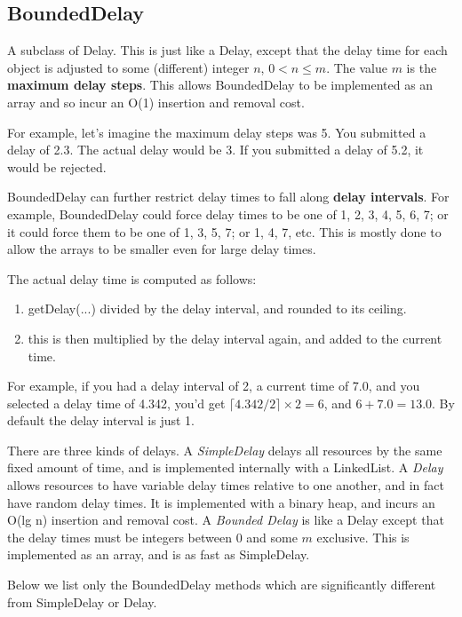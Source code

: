 \documentclass[twoside,10pt]{article}
\begin{document}
\subsection{BoundedDelay}

A subclass of Delay.  This is just like a Delay, except that the delay time for each object is adjusted to some (different) integer \(n\), \(0 < n \leq m\).  The value \(m\) is the {\bf maximum delay steps}.  This allows BoundedDelay to be implemented as an array and so incur an O(1) insertion and removal cost.  

For example, let's imagine the maximum delay steps was 5.  You submitted a delay of 2.3.  The actual delay would be 3.  If you submitted a delay  of 5.2, it would be rejected.

BoundedDelay can further restrict delay times to fall along {\bf delay intervals}.  For example, BoundedDelay could force delay times to be one of 1, 2, 3, 4, 5, 6, 7; or it could force them to be one of 1, 3, 5, 7; or 1, 4, 7, etc.  This is mostly done to allow the arrays to be smaller even for large delay times.  

The actual delay time is computed as follows:
\begin{enumerate}
\item getDelay(...) divided by the delay interval, and rounded to its ceiling.
\item this is then multiplied by the delay interval again, and added to the current time.
\end{enumerate}

For example, if you had a delay interval of 2, a current time of 7.0, and you selected a delay time of 4.342, you'd get \(\lceil 4.342 / 2\rceil \times 2 = 6\), and \(6 + 7.0 = 13.0\).  By default the delay interval is just 1.

There are three kinds of delays.  A {\it SimpleDelay} delays all resources by the same fixed amount of time, and is implemented internally with a LinkedList.  A {\it Delay} allows resources to have variable delay times relative to one another, and in fact have random delay times.  It is implemented with a binary heap, and incurs an O(lg n) insertion and removal cost.  A {\it Bounded Delay} is like a Delay except that the delay times must be integers between 0 and some \(m\) exclusive.  This is implemented as an array, and is as fast as SimpleDelay.

Below we list only the BoundedDelay methods which are significantly different from SimpleDelay or Delay.
\end{document}
